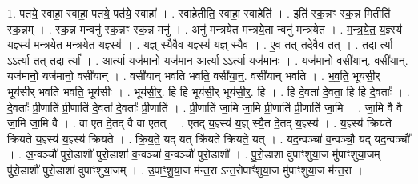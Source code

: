 \documentclass[17pt]{extarticle}
\begin{document}
1. पत॑ये॒ स्वाहा॒ स्वाहा॒ पत॑ये॒ पत॑ये॒ स्वाहा᳚ । . स्वाहेतीति॒ स्वाहा॒ स्वाहेति॑ । . इति॑ स्क॒न्नꣳ स्क॒न्न मितीति॑ स्क॒न्नम् । . स्क॒न्न मन्वनु॑ स्क॒न्नꣳ स्क॒न्न मनु॑ । . अनु॑ मन्त्रयेत मन्त्रये॒ता न्वनु॑ मन्त्रयेत । . म॒न्त्र॒ये॒त॒ य॒ज्ञ्स्य॑ य॒ज्ञ्स्य॑ मन्त्रयेत मन्त्रयेत य॒ज्ञ्स्य॑ । . य॒ज्ञ् स्यै॒वैव य॒ज्ञ्स्य॑ य॒ज्ञ् स्यै॒व । . ए॒व तत् तदे॒वैव तत् । . तदा र्त्या ऽऽर्त्या॒ तत् तदा र्त्या᳚ । . आर्त्या॒ यज॑मानो॒ यज॑मान॒ आर्त्या ऽऽर्त्या॒ यज॑मानः । . यज॑मानो॒ वसी॑या॒न्॒. वसी॑या॒न्॒. यज॑मानो॒ यज॑मानो॒ वसी॑यान् । . वसी॑यान् भवति भवति॒ वसी॑या॒न्॒. वसी॑यान् भवति । . भ॒व॒ति॒ भूय॑सी॒र् भूय॑सीर् भवति भवति॒ भूय॑सीः । . भूय॑सी॒र्॒. हि हि भूय॑सी॒र् भूय॑सी॒र्॒. हि । . हि दे॒वता॑ दे॒वता॒ हि हि दे॒वताः᳚ । . दे॒वताः᳚ प्री॒णाति॑ प्री॒णाति॑ दे॒वता॑ दे॒वताः᳚ प्री॒णाति॑ । . प्री॒णाति॑ जा॒मि जा॒मि प्री॒णाति॑ प्री॒णाति॑ जा॒मि । . जा॒मि वै वै जा॒मि जा॒मि वै । . वा ए॒त दे॒तद् वै वा ए॒तत् । . ए॒तद् य॒ज्ञ्स्य॑ य॒ज्ञ् स्यै॒त दे॒तद् य॒ज्ञ्स्य॑ । . य॒ज्ञ्स्य॑ क्रियते क्रियते य॒ज्ञ्स्य॑ य॒ज्ञ्स्य॑ क्रियते । . क्रि॒य॒ते॒ यद् यत् क्रि॑यते क्रियते॒ यत् । . यद॒न्वञ्चा॑ व॒न्वञ्चौ॒ यद् यद॒न्वञ्चौ᳚ । . अ॒न्वञ्चौ॑ पुरो॒डाशौ॑ पुरो॒डाशा॑ व॒न्वञ्चा॑ व॒न्वञ्चौ॑ पुरो॒डाशौ᳚ । . पु॒रो॒डाशा॑ वुपाꣳशुया॒ज मु॑पाꣳशुया॒जम् पु॑रो॒डाशौ॑ पुरो॒डाशा॑ वुपाꣳशुया॒जम् । . उ॒पाꣳ॒॒शु॒या॒ज म॑न्त॒रा ऽन्त॒रोपाꣳ॑शुया॒ज मु॑पाꣳशुया॒ज म॑न्त॒रा । \newline
\end{document}
